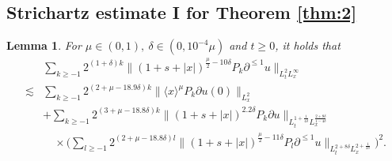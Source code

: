 \documentclass[11pt,twoside]{article}
\def\f{\frac}
\def\p{\partial}
\def\ls{\lesssim}
\newcommand{\w}[1]{\langle {#1} \rangle}
\theoremstyle{plain}
\newtheorem{lemma}[theorem]{Lemma}
\theoremstyle{definition}
\numberwithin{equation}{section}
\begin{document}
\subsection{Strichartz estimate I for Theorem \ref{thm:2}}

\begin{lemma}\label{lem:Estimate of Besov norm 2}
	For $\mu\in(0,1),\ \delta\in (0,10^{-4}\mu)$ and $t\ge0$, it holds that
	\begin{equation}\label{ineq:Estimate of Besov norm 2}
	\begin{split}
	&\sum_{k\ge -1}2^{(1+\delta) k}\|(1+s+|x|)^{\f{\mu}{2}-10\delta}P_k\p^{\le 1} u\|_{L^{2}_tL^\infty_x}\\
	\ls&
	\sum_{k\ge -1}2^{(2 +\mu -18.9\delta) k}\|\w{x}^{\mu}P_k\partial u(0)\|_{L^2_x}\\
	&+
	\sum_{k\ge -1}2^{(3 +\mu -18.8\delta) k}\|(1+s+|x|)^{2.2\delta} P_{k}\p u\|_{L_t^{1+\f{1}{4\delta}}L^{\f{2+8\delta}{1-4\delta}}_x}\\
	&\quad\times
	\big(\sum_{l\ge-1}2^{(2 +\mu-18.8\delta) l} \|(1+s+|x|)^{\f{\mu}{2}-11\delta}P_{l}\p^{\le 1} u\|_{L_t^{2+8\delta}L^{2+\f{1}{2\delta}}_x}\big)^2.
	\end{split}
	\end{equation}
\end{lemma}	
\end{document}
